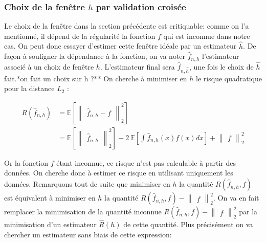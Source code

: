 \documentclass[
]{book}
\begin{document}
\hypertarget{choix-de-la-fenuxeatre-h-par-validation-croisuxe9e}{%
\subsubsection{\texorpdfstring{Choix de la fenêtre \(h\) par validation croisée}{Choix de la fenêtre h par validation croisée}}\label{choix-de-la-fenuxeatre-h-par-validation-croisuxe9e}}

Le choix de la fenêtre dans la section précédente est critiquable: comme on l'a mentionné, il dépend de la régularité la fonction \(f\) qui est inconnue dans notre cas. On peut donc essayer d'estimer cette fenêtre idéale par un estimateur \(\hat{h}\). De façon à souligner la dépendance à la fonction, on va noter \(\hat{f}_{n,h}\) l'estimateur associé à un choix de fenêtre \(h\). L'estimateur final sera \(\hat{f}_{n,\hat{h}}\), une fois le choix de \(\hat{h}\) fait.\newline       **on fait un choix sur h ?**
On cherche à minimiser en \(h\) le risque quadratique pour la distance \(L_2\) :

\[
\begin{aligned}
R(\hat {f}_{n,h})&=\mathbb{E}[\begin{Vmatrix}\hat {f}_{n,h}-f\end{Vmatrix}_2^2]\\        
&= \mathbb{E}[\begin{Vmatrix}\hat {f}_{n,h}\end{Vmatrix}_2^2] -2~\mathbb{E}[\int \hat {f}_{n,h}(x)f(x)dx] +\begin{Vmatrix}f\end{Vmatrix}_2^2
\end{aligned}
\]

Or la fonction \(f\) étant inconnue, ce risque n'est pas calculable à partir des données. On cherche donc à estimer ce risque en utilisant uniquement les données. Remarquons tout de suite que minimiser en \(h\) la quantité \(R(\hat {f}_{n,h}, f)\) est équivalent à minimiser en \(h\) la quantité \(R(\hat {f}_{n,h}, f)-\begin{Vmatrix}f\end{Vmatrix}_2^2\). On va en fait remplacer la minimisation de la quantité inconnue \(R(\hat {f}_{n,h}, f)-\begin{Vmatrix}f\end{Vmatrix}_2^2\) par la minimisation d'un estimateur \(\hat {R}(h)\) de cette quantité. Plus précisément on va chercher un estimateur sans biais de cette expression:
\end{document}
